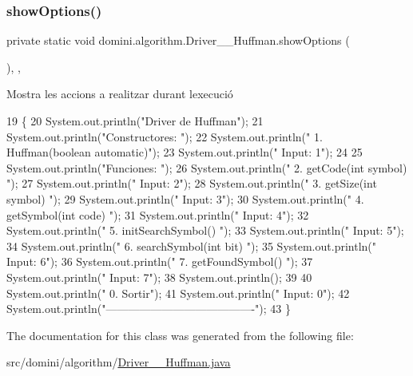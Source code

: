 \subsubsection{\texorpdfstring{show\+Options()}{showOptions()}}
{\footnotesize\ttfamily private static void domini.\+algorithm.\+Driver\+\_\+\+\_\+\+Huffman.\+show\+Options (\begin{DoxyParamCaption}{ }\end{DoxyParamCaption})\hspace{0.3cm}{\ttfamily [inline]}, {\ttfamily [static]}, {\ttfamily [private]}}



Mostra les accions a realitzar durant l\textquotesingle{}execució 


\begin{DoxyCode}
19                                      \{
20         System.out.println(\textcolor{stringliteral}{"Driver de Huffman"});
21         System.out.println(\textcolor{stringliteral}{"Constructores: "});
22         System.out.println(\textcolor{stringliteral}{"     1. Huffman(boolean automatic)"});
23         System.out.println(\textcolor{stringliteral}{"     Input: 1"});
24 
25         System.out.println(\textcolor{stringliteral}{"Funciones: "});
26         System.out.println(\textcolor{stringliteral}{"     2. getCode(int symbol) "});
27         System.out.println(\textcolor{stringliteral}{"     Input: 2"});
28         System.out.println(\textcolor{stringliteral}{"     3. getSize(int symbol) "});
29         System.out.println(\textcolor{stringliteral}{"     Input: 3"});
30         System.out.println(\textcolor{stringliteral}{"     4. getSymbol(int code) "});
31         System.out.println(\textcolor{stringliteral}{"     Input: 4"});
32         System.out.println(\textcolor{stringliteral}{"     5. initSearchSymbol() "});
33         System.out.println(\textcolor{stringliteral}{"     Input: 5"});
34         System.out.println(\textcolor{stringliteral}{"     6. searchSymbol(int bit) "});
35         System.out.println(\textcolor{stringliteral}{"     Input: 6"});
36         System.out.println(\textcolor{stringliteral}{"     7. getFoundSymbol() "});
37         System.out.println(\textcolor{stringliteral}{"     Input: 7"});
38         System.out.println();
39 
40         System.out.println(\textcolor{stringliteral}{"     0. Sortir"});
41         System.out.println(\textcolor{stringliteral}{"     Input: 0"});
42         System.out.println(\textcolor{stringliteral}{"----------------------------------------"});
43     \}
\end{DoxyCode}


The documentation for this class was generated from the following file\+:\begin{DoxyCompactItemize}
\item 
src/domini/algorithm/\hyperlink{Driver____Huffman_8java}{Driver\+\_\+\+\_\+\+Huffman.\+java}\end{DoxyCompactItemize}
